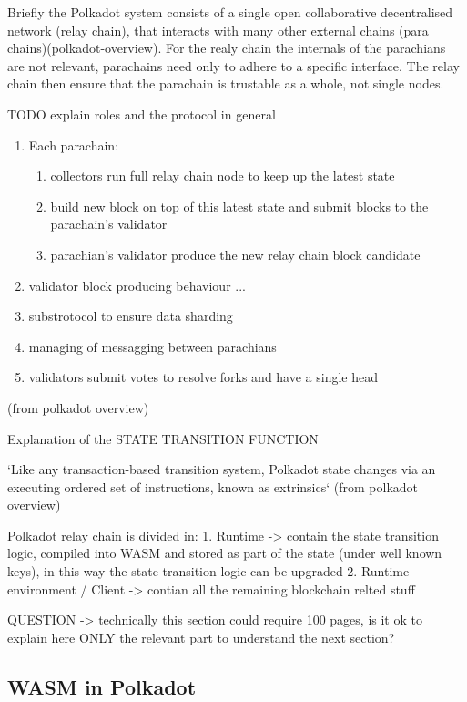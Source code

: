 \documentclass[../main.tex]{subfiles}
\begin{document}
Briefly the Polkadot system consists of a single open collaborative decentralised network (relay chain), that interacts with many other external chains (para chains)(polkadot-overview). For the realy chain the internals of the parachians are not relevant, parachains need only to adhere to a specific interface. The relay chain then ensure that the parachain is trustable as a whole, not single nodes.

TODO explain roles and the protocol in general

\begin{enumerate}
  \item Each parachain:
        \begin{enumerate}
                \item collectors run full relay chain node to keep up the latest state
                \item build new block on top of this latest state and submit blocks to the parachain's validator
                \item parachian's validator produce the new relay chain block candidate
        \end{enumerate}
    \item validator block producing behaviour ...
    \item substrotocol to ensure data sharding
    \item managing of messagging between parachians
    \item validators submit votes to resolve forks and have a single head
\end{enumerate}

(from polkadot overview)

Explanation of the STATE TRANSITION FUNCTION

`Like any transaction-based transition system, Polkadot state changes via an executing ordered set of instructions, known as extrinsics`
(from polkadot overview)

Polkadot relay chain is divided in:
    1. Runtime -> contain the state transition logic, compiled into WASM and stored as part of the state (under well known keys), in this way the state transition logic can be upgraded
    2. Runtime environment / Client -> contian all the remaining blockchain relted stuff

QUESTION -> technically this section could require 100 pages, is it ok to explain here ONLY the relevant part to understand the next section?

\subsection{WASM in Polkadot}
\end{document}
